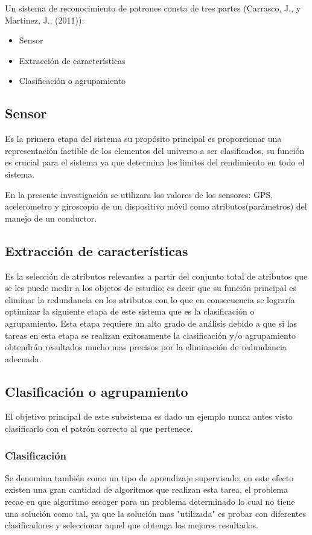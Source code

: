 Un sistema de reconocimiento de patrones consta de tres partes (Carrasco, J., y Martinez, J., (2011)):
\begin{itemize}
 \item Sensor
 \item Extracción de características 
 \item Clasificación o agrupamiento
\end{itemize}

\subsection{Sensor}
Es la primera etapa del sistema su propósito principal es proporcionar una representación factible de los elementos del universo a ser clasificados, su función es crucial para el sistema ya que determina los limites del rendimiento en todo el sistema.

En la presente investigación se utilizara los valores de los sensores: GPS, acelerometro y giroscopio de un dispositivo móvil como atributos(parámetros) del manejo de un conductor.

\subsection{Extracción de características}
Es la selección de atributos relevantes a partir del conjunto total de atributos que se les puede medir a los objetos de estudio; es decir que su función principal es eliminar la redundancia en los atributos con lo que en consecuencia se lograría optimizar la siguiente etapa de este sistema que es la clasificación o agrupamiento.
Esta etapa requiere un alto grado de análisis debido a que si las tareas en esta etapa se realizan exitosamente la clasificación y/o agrupamiento obtendrán resultados mucho mas precisos por la eliminación de redundancia adecuada.

\subsection{Clasificación o agrupamiento}
El objetivo principal de este subsistema es dado un ejemplo nunca antes visto clasificarlo con el patrón correcto al que pertenece.

\subsubsection{Clasificación}
Se denomina también como un tipo de aprendizaje supervisado; en este efecto existen una gran cantidad de algoritmos que realizan esta tarea, el problema recae en que algoritmo escoger para un problema determinado lo cual no tiene una solución como tal, ya que la solución mas "utilizada" es probar con diferentes clasificadores y seleccionar aquel que obtenga los mejores resultados.
 
